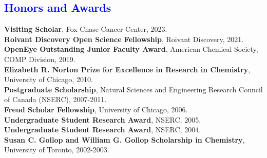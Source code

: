 \documentclass[margin,line]{res}
\begin{document}
\begin{resume}

\section{\sc \textcolor{blue}{ Honors and Awards} }
{\bf Visiting Scholar}, Fox Chase Cancer Center, 2023. \\
{\bf Roivant Discovery Open Science Fellowship}, Roivant Discovery, 2021. \\
{\bf OpenEye Outstanding Junior Faculty Award}, American Chemical Society, COMP Division, 2019. \\
{\bf Elizabeth R. Norton Prize for Excellence in Research in Chemistry}, University of Chicago, 2010. \\
{\bf Postgraduate Scholarship}, Natural Sciences and Engineering Research Council of Canada (NSERC), 2007-2011.\\
{\bf Freud Scholar Fellowship}, University of Chicago, 2006. \\
{\bf Undergraduate Student Research Award}, NSERC, 2005. \\
{\bf Undergraduate Student Research Award}, NSERC, 2004. \\
{\bf Susan C. Gollop and William G. Gollop Scholarship in Chemistry}, University of Toronto, 2002-2003. \\


\end{resume}
\end{document}
